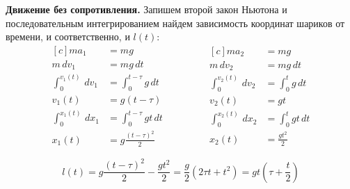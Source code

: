 \documentclass[a5paper,10pt]{article}
\begin{document}
\textbf{Движение без сопротивления.}
Запишем второй закон Ньютона и последовательным интегрированием найдем зависимость координат шариков от времени, и соответственно, и $l(t)$:
\begin{equation*}
    \begin{aligned}[c]
        ma_1&=mg\\
        m\,dv_1&=mg\,dt\\
        \int_0^{v_1(t)}\,dv_1&=\int_0^{t-\tau} g\,dt\\   
        v_1(t)&=g(t-\tau)\\
        \int_0^{x_1(t)}\,dx_1&=\int_0^{t-\tau} gt\,dt\\ 
        x_1(t)&=g\frac{(t-\tau)^2}{2}
    \end{aligned}
        \qquad\qquad
    \begin{aligned}[c]
        ma_2&=mg\\
        m\,dv_2&=mg\,dt\\
        \int_0^{v_2(t)}\,dv_2&=\int_0^t g\,dt\\   
        v_2(t)&=gt\\
        \int_0^{x_2(t)}\,dx_2&=\int_0^t gt\,dt\\ 
        x_2(t)&=\frac{gt^2}{2}
    \end{aligned}
\end{equation*}

\begin{equation*}
     l(t)=g\frac{(t-\tau)^2}{2}-\frac{gt^2}{2}=\frac{g}{2}(2\tau{t}+t^2)=gt(\tau+ \frac{t}{2} )
\end{equation*}
\end{document}
